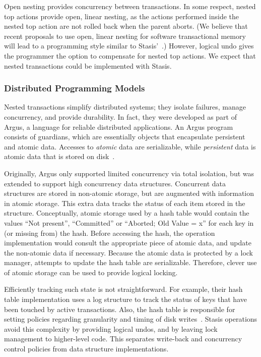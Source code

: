 \documentclass[letterpaper,twocolumn,10pt]{article}
\newcommand{\yad}{Stasis\xspace}
\newcommand{\yads}{Stasis'\xspace}
\begin{document}
Open nesting provides concurrency between transactions.  In some
respect, nested top actions provide open, linear nesting, as the
actions performed inside the nested top action are not rolled back
when the parent aborts.  (We believe that recent proposals to use
open, linear nesting for software transactional memory will lead to a
programming style similar to \yads~\cite{nestedTransactionPoster}.)
However, logical undo gives the programmer the option to compensate
for nested top actions. We expect that nested transactions could be
implemented with \yad.

\subsubsection{Distributed Programming Models}
\label{sec:argus}

Nested transactions simplify distributed systems; they isolate
failures, manage concurrency, and provide durability.  In fact, they
were developed as part of Argus, a language for reliable distributed
applications.  An Argus program consists of guardians, which are essentially
objects that encapsulate persistent and atomic data.  Accesses to {\em
atomic} data are serializable, while {\em persistent} data is atomic
data that is stored on disk~\cite{argus}.

Originally, Argus only supported limited concurrency via total
isolation, but was extended to support high concurrency data
structures.  Concurrent data structures are stored in non-atomic storage, but are augmented with
information in atomic storage.  This extra data tracks the
status of each item stored in the structure.  Conceptually, atomic 
storage used by a hash table would contain the values ``Not present'',
``Committed'' or ``Aborted; Old Value = x'' for each key in (or
missing from) the hash.  Before accessing the hash, the operation
implementation would consult the appropriate piece of atomic data, and
update the non-atomic data if necessary.  Because the atomic data is
protected by a lock manager, attempts to update the hash table are serializable.
Therefore, clever use of atomic storage can be used to provide logical locking.

Efficiently
tracking such state is not straightforward.  For example, their
hash table implementation uses a log structure to
track the status of keys that have been touched by 
active transactions.  Also, the hash table is responsible for setting 
policies regarding granularity and timing of disk writes~\cite{argusImplementation}.  \yad operations avoid this
complexity by providing logical undos, and by leaving lock management
to higher-level code.  This separates write-back and concurrency
control policies from data structure implementations.
\end{document}
